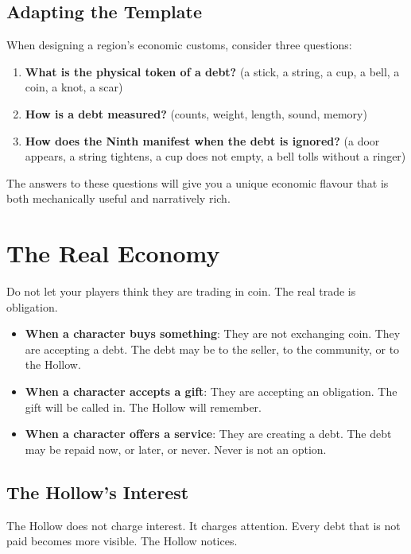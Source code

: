 \documentclass[11pt,letterpaper,twoside]{book}
\begin{document}
\subsection{Adapting the Template}

When designing a region's economic customs, consider three questions:

\begin{enumerate}
\item \textbf{What is the physical token of a debt?} (a stick, a string, a cup, a bell, a coin, a knot, a scar)
\item \textbf{How is a debt measured?} (counts, weight, length, sound, memory)
\item \textbf{How does the Ninth manifest when the debt is ignored?} (a door appears, a string tightens, a cup does not empty, a bell tolls without a ringer)
\end{enumerate}

The answers to these questions will give you a unique economic flavour that is both mechanically useful and narratively rich.

\section{The Real Economy}

Do not let your players think they are trading in coin. The real trade is obligation.

\begin{itemize}
\item \textbf{When a character buys something}: They are not exchanging coin. They are accepting a debt. The debt may be to the seller, to the community, or to the Hollow.
\item \textbf{When a character accepts a gift}: They are accepting an obligation. The gift will be called in. The Hollow will remember.
\item \textbf{When a character offers a service}: They are creating a debt. The debt may be repaid now, or later, or never. Never is not an option.
\end{itemize}

\subsection{The Hollow's Interest}

The Hollow does not charge interest. It charges attention. Every debt that is not paid becomes more visible. The Hollow notices.
\end{document}
